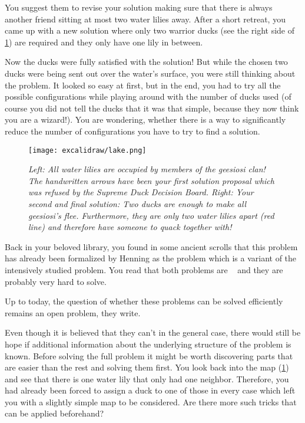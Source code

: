 You suggest them to revise your solution making sure that there is always another friend sitting at most two water lilies away. After a short retreat, you came up with a new solution where only two warrior ducks (see the right side of \cref{fig:duck-lake}) are required and they only have one lily in between. 

Now the ducks were fully satisfied with the solution! But while the chosen two ducks were being sent out over the water's surface, you were still thinking about the problem.
It looked so easy at first, but in the end, you had to try all the possible configurations while playing around with the number of ducks used (of course you did not tell the ducks that it was that simple, because they now think you are a wizard!). 
You are wondering, whether there is a way to significantly reduce the number of configurations you have to try to find a solution.

\begin{figure}[t]
    \centering
    \texttt{[image: excalidraw/lake.png]}
    \caption[Introductions: Merganser Lake. Own Drawing. Embedded icons under public domain from {\href{https://creazilla.com/}{https://creazilla.com/}}]{\textit{Left: All water lilies are occupied by members of the \textit{geesiosi} clan! The handwritten arrows have been your first solution proposal which was refused by the \textit{Supreme Duck Decision Board}.
    Right: Your second and final solution: Two ducks are enough to make all \textit{geesiosi}'s flee. Furthermore, they are only two water lilies apart (red line) and therefore have someone to quack together with!}}
    \label{fig:duck-lake}
\end{figure}


Back in your beloved library, you found in some ancient scrolls that this problem has already been formalized by Henning \cite{Henning2019} as the \sdom problem which is a variant of the intensively studied \dom problem. 
You read that both problems are \NPc~\cite{Garey1979,Henning2019} and they are probably very hard to solve.

Up to today, the question of whether these \NPc problems can be solved efficiently remains an open problem, they write. 

Even though it is believed that they can't in the general case, there would still be hope if additional information about the underlying structure of the problem is known. 
Before solving the full problem it might be worth discovering parts that are easier than the rest and solving them first. You look back into the map (\cref{fig:duck-lake}) and see that there is one water lily that only had one neighbor.
Therefore, you had already been forced to assign a duck to one of those in every case which left you with a slightly simple map to be considered. Are there more such tricks that can be applied beforehand?

